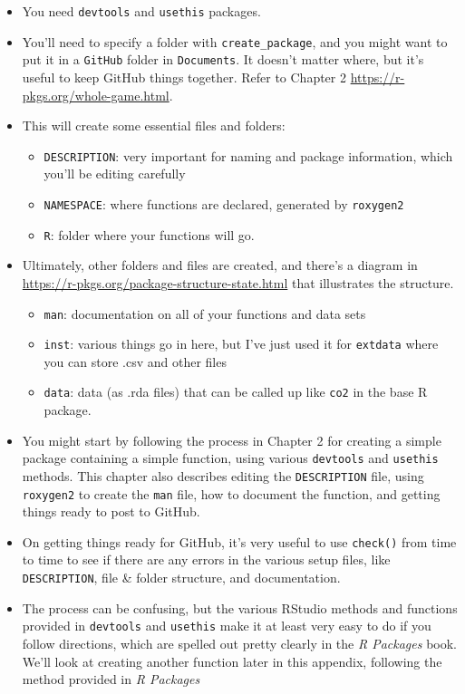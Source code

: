 \documentclass[
]{book}
\providecommand{\tightlist}{%
  \setlength{\itemsep}{0pt}\setlength{\parskip}{0pt}}
\begin{document}
\begin{itemize}
\item
  You need \texttt{devtools} and \texttt{usethis} packages.
\item
  You'll need to specify a folder with \texttt{create\_package}, and you might want to put it in a \texttt{GitHub} folder in \texttt{Documents}. It doesn't matter where, but it's useful to keep GitHub things together. Refer to Chapter 2 \url{https://r-pkgs.org/whole-game.html}.
\item
  This will create some essential files and folders:

  \begin{itemize}
  \tightlist
  \item
    \texttt{DESCRIPTION}: very important for naming and package information, which you'll be editing carefully
  \item
    \texttt{NAMESPACE}: where functions are declared, generated by \texttt{roxygen2}
  \item
    \texttt{R}: folder where your functions will go.
  \end{itemize}
\item
  Ultimately, other folders and files are created, and there's a diagram in \url{https://r-pkgs.org/package-structure-state.html} that illustrates the structure.

  \begin{itemize}
  \tightlist
  \item
    \texttt{man}: documentation on all of your functions and data sets
  \item
    \texttt{inst}: various things go in here, but I've just used it for \texttt{extdata} where you can store .csv and other files
  \item
    \texttt{data}: data (as .rda files) that can be called up like \texttt{co2} in the base R package.
  \end{itemize}
\item
  You might start by following the process in Chapter 2 for creating a simple package containing a simple function, using various \texttt{devtools} and \texttt{usethis} methods. This chapter also describes editing the \texttt{DESCRIPTION} file, using \texttt{roxygen2} to create the \texttt{man} file, how to document the function, and getting things ready to post to GitHub.
\item
  On getting things ready for GitHub, it's very useful to use \texttt{check()} from time to time to see if there are any errors in the various setup files, like \texttt{DESCRIPTION}, file \& folder structure, and documentation.
\item
  The process can be confusing, but the various RStudio methods and functions provided in \texttt{devtools} and \texttt{usethis} make it at least very easy to do if you follow directions, which are spelled out pretty clearly in the \emph{R Packages} book. We'll look at creating another function later in this appendix, following the method provided in \emph{R Packages}
\end{itemize}
\end{document}
